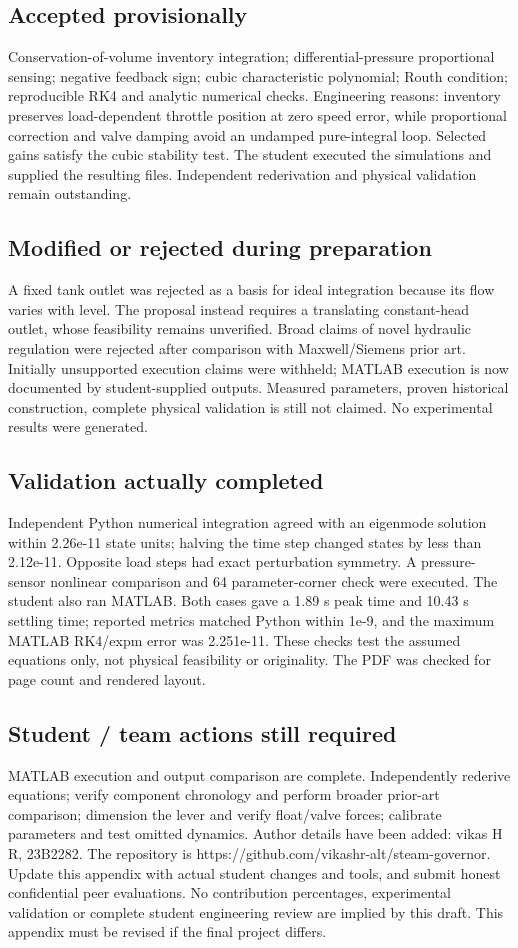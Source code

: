 \documentclass[conference]{IEEEtran}
\begin{document}
\subsection*{Accepted provisionally}
Conservation-of-volume inventory integration; differential-pressure proportional sensing; negative feedback sign; cubic characteristic polynomial; Routh condition; reproducible RK4 and analytic numerical checks. Engineering reasons: inventory preserves load-dependent throttle position at zero speed error, while proportional correction and valve damping avoid an undamped pure-integral loop. Selected gains satisfy the cubic stability test. The student executed the simulations and supplied the resulting files. Independent rederivation and physical validation remain outstanding.
\subsection*{Modified or rejected during preparation}
A fixed tank outlet was rejected as a basis for ideal integration because its flow varies with level. The proposal instead requires a translating constant-head outlet, whose feasibility remains unverified. Broad claims of novel hydraulic regulation were rejected after comparison with Maxwell/Siemens prior art. Initially unsupported execution claims were withheld; MATLAB execution is now documented by student-supplied outputs. Measured parameters, proven historical construction, complete physical validation is still not claimed. No experimental results were generated.
\subsection*{Validation actually completed}
Independent Python numerical integration agreed with an eigenmode solution within 2.26e-11 state units; halving the time step changed states by less than 2.12e-11. Opposite load steps had exact perturbation symmetry. A pressure-sensor nonlinear comparison and 64 parameter-corner check were executed. The student also ran MATLAB. Both cases gave a 1.89 s peak time and 10.43 s settling time; reported metrics matched Python within 1e-9, and the maximum MATLAB RK4/expm error was 2.251e-11. These checks test the assumed equations only, not physical feasibility or originality. The PDF was checked for page count and rendered layout.
\subsection*{Student / team actions still required}
MATLAB execution and output comparison are complete. Independently rederive equations; verify component chronology and perform broader prior-art comparison; dimension the lever and verify float/valve forces; calibrate parameters and test omitted dynamics. Author details have been added: vikas H R, 23B2282. The repository is https://github.com/vikashr-alt/steam-governor. Update this appendix with actual student changes and tools, and submit honest confidential peer evaluations. No contribution percentages, experimental validation or complete student engineering review are implied by this draft. This appendix must be revised if the final project differs.
\end{document}
